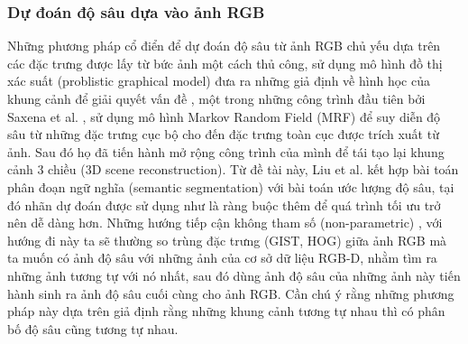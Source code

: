 \subsubsection{Dự đoán độ sâu dựa vào ảnh RGB}
Những phương pháp cổ điển để dự đoán độ sâu từ ảnh RGB chủ yếu dựa trên các đặc trưng được lấy từ bức ảnh một cách thủ công, sử dụng mô hình đồ thị xác suất (problistic graphical model) đưa ra những giả định về hình học của khung cảnh để giải quyết vấn đề \cite{hoiem2005geometric,liu2010single, saxena2006learning, saxena2009make3d}, một trong những công trình đầu tiên bởi Saxena et al. \cite{saxena2006learning}, sử dụng mô hình Markov Random Field (MRF) để suy diễn độ sâu từ những đặc trưng cục bộ cho đến đặc trưng toàn cục được trích xuất từ ảnh. Sau đó họ đã tiến hành mở rộng công trình của mình để tái tạo lại khung cảnh 3 chiều \cite{saxena2009make3d}(3D scene reconstruction). Từ đề tài này, Liu et al. \cite{liu2010single} kết hợp bài toán phân đoạn ngữ nghĩa (semantic segmentation) với bài toán ước lượng độ sâu, tại đó nhãn dự đoán được sử dụng như là ràng buộc thêm để quá trình tối ưu trở nên dễ dàng hơn. Những hướng tiếp cận không tham số (non-parametric) \cite{karsch2014depth, liu2011sift, liu2014discrete, konrad20122d}, với hướng đi này ta sẽ thường so trùng đặc trưng (GIST, HOG) giữa ảnh RGB mà ta muốn có ảnh độ sâu với những ảnh của cơ sở dữ liệu RGB-D, nhằm tìm ra những ảnh tương tự với nó nhất, sau đó dùng ảnh độ sâu của những ảnh này tiến hành sinh ra ảnh độ sâu cuối cùng cho ảnh RGB. Cần chú ý rằng những phương pháp này dựa trên giả định rằng những khung cảnh tương tự nhau thì có phân bố độ sâu cũng tương tự nhau.\\

